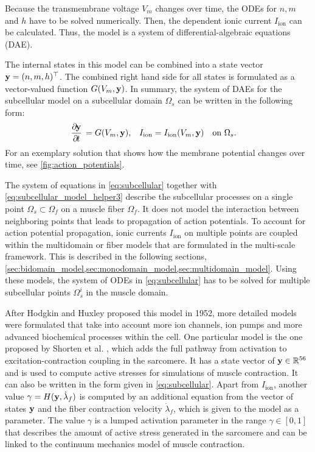 Because the transmembrane voltage $V_m$ changes over time, the ODEs for $n, m$ and $h$ have to be solved numerically. Then, the dependent ionic current $I_\text{ion}$ can be calculated. Thus, the model is a system of differential-algebraic equations (DAE).

The internal states in this model can be combined into a state vector $\textbf{y} = (n,m,h)^\top$. 
The combined right hand side for all states is formulated as a vector-valued function $G(V_m,\textbf{y})$.
In summary, the system of DAEs for the subcellular model on a subcellular domain $\Omega_s$ can be written in the following form:
\begin{align}
  \dfrac{\partial\bfy}{\partial t} &= G(V_m,\bfy),& I_\text{ion}&=I_\text{ion}(V_m,\bfy) \quad \text{on }\Omega_s\label{eq:subcellular}.
\end{align}
For an exemplary solution that shows how the membrane potential changes over time, see \cref{fig:action_potentials}. 

The system of equations in \cref{eq:subcellular} together with \cref{eq:subcellular_model_helper3} describe the subcellular processes on a single point $\Omega_s \subset \Omega_f$ on a muscle fiber $\Omega_f$. 
It does not model the interaction between neighboring points that leads to propagation of action potentials.
To account for action potential propagation, ionic currents $I_\text{ion}$ on multiple points are coupled within the multidomain or fiber models that are formulated in the multi-scale framework. This is described in the following sections, \cref{sec:bidomain_model,sec:monodomain_model,sec:multidomain_model}.
Using these models, the system of ODEs in \cref{eq:subcellular} has to be solved for multiple subcellular points $\Omega_s^i$ in the muscle domain.

After Hodgkin and Huxley proposed this model in 1952, more detailed models were formulated that take into account more ion channels, ion pumps and more advanced biochemical processes within the cell. One particular model is the one proposed by Shorten et al. \cite{Shorten2007}, which adds the full pathway from activation to excitation-contraction coupling in the sarcomere. It has a state vector of $\textbf{y} \in \mathbb{R}^{56}$ and is used to compute active stresses for simulations of muscle contraction. 
It can also be written in the form given in \cref{eq:subcellular}.
Apart from $I_\text{ion}$, another value $\gamma = H(\textbf{y},\dot{\lambda}_f)$ is computed by an additional equation from the vector of states $\textbf{y}$ and the fiber contraction velocity $\dot{\lambda}_f$, which is given to the model as a parameter.
The value $\gamma$ is a lumped activation parameter in the range $\gamma \in [0,1]$ that describes the amount of active stress generated in the sarcomere and can be linked to the continuum mechanics model of muscle contraction.

